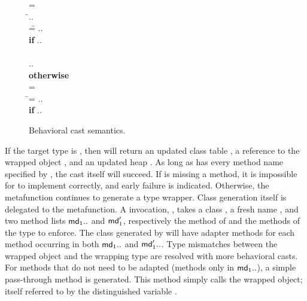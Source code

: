 \documentclass[USenglish]{tex/lipics-v2016}
\begin{document}
\begin{figure}[!h]
\hspace{8mm}\begin{minipage}{12cm}\begin{tabbing}\small
  \wrap{}\D = \\
  \HS\HS\WHERE\HS\= \Mdef\m\x{\t[1]}{\t[2]}\e\In\md[1].. \\
                 \> \mdpp[1] =\= \src{\Mdef\m\x{\tp[1]}{\tp[2]}{~\BehCast{\tp[2]}{\KCall{\FRead\that}\m{\bscast{\tp[1]}\x}{\t[1]}{\t[2]}}}} .. \\
\> \> \HS\HS \= \textbf{if} \HS \Mdef\m\x{\tp[1]}{\tp[2]}\ep\In\mdp[1].. \\
\\[-3mm]
\> \>  \src{\Mdef\m\x{\t[1]}{\t[2]}{~\KCall{\FRead\that}\m{\x}{\t[1]}{\t[2]}}} .. \\ \> \> \HS\HS \textbf{otherwise}
\\[2mm]
   = \\
\HS\HS\WHERE\HS\=\mdp[1] = \src{ \Mdef\m\x{\any}{\any}{~\BehCast\any{ \KCall{\FRead\that} \m {\bscast{\t}\x}{\t}{\tp}} } }   ..
    \HS\HS\HS\HS \\ \> \> \HS\HS \= \textbf{if} \HS \Mdef\m\x{\t}{\tp}\e\In\md[1].. \\
\end{tabbing}\end{minipage}

\vspace{-2mm}

\hrulefill
\caption{Behavioral cast semantics.}\label{behavetext}
\end{figure}

\newcommand{\W}{\xt{W}\xspace}

If the target type is \Cp, then \behcastS\a\Cp\s\K will return an updated
class table \Kp, a reference to the wrapped object \ap, and an updated heap
\sp. As long as \a has every method name specified by \Cp, the cast itself
will succeed. If \a is missing a method, it is impossible for \a to
implement \Cp correctly, and early failure is indicated. Otherwise, the
metafunction continues to generate a type wrapper.  Class generation itself
is delegated to the \W metafunction.  A \W invocation,
\EM{\W(\C,\md_1..,\mdp_1.., \D)}, takes a class \C, a fresh name \D, and two
method lists $\md_1..$ and $\mdp_1$, respectively the method of \C and the
methods of the type to enforce.  The class generated by \W will have adapter
methods for each method \m occurring in both $\md_1..$ and $\mdp_1..$. Type
mismatches between the wrapped object and the wrapping type are resolved
with more behavioral casts. For methods that do not need to be adapted
(methods only in $\md_1..$), a simple pass-through method is generated. This
method simply calls the wrapped object; itself referred to by the
distinguished variable \that.
\end{document}
